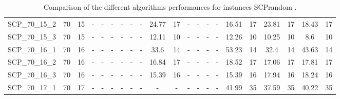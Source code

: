 \begin{sidewaystable}[!ht]
{\begin{tabular}{lcccccccccccccccccccc}
SCP\_70\_15\_2 & 70 & 15 &  - &  - &  - &  - &  - &  - & 24.77 & 17 &  - &  - &  - &  - & 16.51 & 17 & 23.81 & 17 & 18.43 & 17 \\
SCP\_70\_15\_3 & 70 & 15 &  - &  - &  - &  - &  - &  - & 12.11 & 10 &  - &  - &  - &  - & 12.26 & 10 & 10.25 & 10 & 8.6 & 10 \\
SCP\_70\_16\_1 & 70 & 16 &  - &  - &  - &  - &  - &  - & 33.6 & 14 &  - &  - &  - &  - & 53.23 & 14 & 32.4 & 14 & 43.63 & 14 \\
SCP\_70\_16\_2 & 70 & 16 &  - &  - &  - &  - &  - &  - & 16.84 & 17 &  - &  - &  - &  - & 18.52 & 17 & 17.06 & 17 & 17.81 & 17 \\
SCP\_70\_16\_3 & 70 & 16 &  - &  - &  - &  - &  - &  - & 15.39 & 16 &  - &  - &  - &  - & 15.39 & 16 & 17.94 & 16 & 18.24 & 16 \\
SCP\_70\_17\_1 & 70 & 17 &  - &  - &  - &  - &  - &  - &  - &  - &  - &  - &  - &  - & 41.99 & 35 & 37.59 & 35 & 40.22 & 35 \\
\bottomrule
\end{tabular}
}%
\caption{Comparison of the different algorithms performances for instances SCPrandom .}
\label{tab:table_compare_SCPrandom }
\end{sidewaystable}
